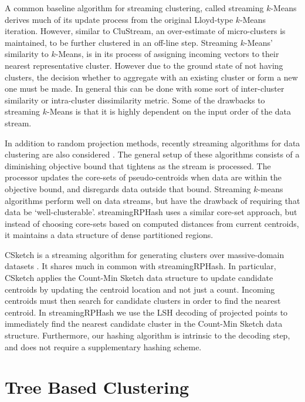A common baseline algorithm for streaming clustering, called streaming $k$-Means\cite{braverman,streamkmeans} derives much of its update process from
the original Lloyd-type $k$-Means iteration.  However, similar to CluStream, an over-estimate of micro-clusters is
maintained, to be further clustered in an off-line step.  Streaming $k$-Means' similarity to $k$-Means, is in its process of
assigning incoming vectors to their nearest representative cluster.  However due to the ground state of not having
clusters, the decision whether to aggregate with an existing cluster or form a new one must be made.  In general this
can be done with some sort of inter-cluster similarity or intra-cluster dissimilarity metric.  Some of the drawbacks to
streaming $k$-Means is that it is highly dependent on the input order of the data stream.

In addition to random projection methods, recently streaming algorithms for data clustering are also considered
\cite{Har-Peled,braverman}.  The general setup of these algorithms consists of a diminishing objective bound that
tightens as the stream is processed.  The processor updates the core-sets of pseudo-centroids when data are within the
objective bound, and disregards data outside that bound.  Streaming $k$-means algorithms perform well on data streams,
but have the drawback of requiring that data be `well-clusterable'.  \textsf{streamingRPHash} uses a similar core-set
approach, but instead of choosing core-sets based on computed distances from current centroids, it maintains a data
structure of dense partitioned regions.

CSketch is a streaming algorithm for generating clusters over massive-domain datasets \cite{aggarwal}.  It shares much
in common with \textsf{streamingRPHash}.  In particular, CSketch applies the Count-Min Sketch data structure to update
candidate centroids by updating the centroid location and not just a count.  Incoming centroids must then search for
candidate clusters in order to find the nearest centroid.  In \textsf{streamingRPHash} we use the LSH decoding of
projected points to immediately find the nearest candidate cluster in the Count-Min Sketch data structure.  Furthermore,
our hashing algorithm is intrinsic to the decoding step, and does not require a supplementary hashing scheme.

\section{Tree Based Clustering}

